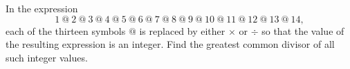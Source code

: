 In the expression
\[1\ @\ 2\ @\ 3\ @\ 4\ @\ 5\ @\ 6\ @\ 7\ @\ 8\ @\ 9\ @\ 10\ @\ 11\ @\ 12\ @\ 13\ @\ 14,\]
each of the thirteen symbols $@$ is replaced by either $\times$ or $\div$ so that the value of the resulting expression is an integer. Find the greatest common divisor of all such integer values.
